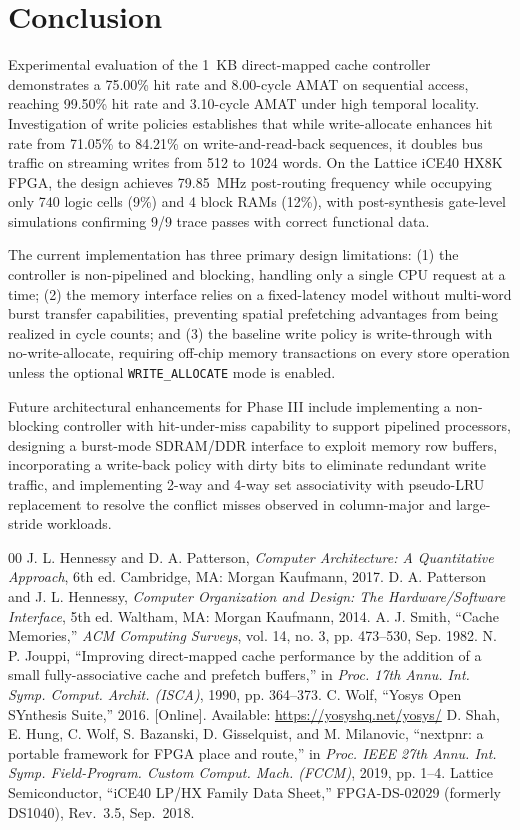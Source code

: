 \documentclass[conference]{IEEEtran}
\begin{document}
\section{Conclusion}
Experimental evaluation of the 1~KB direct-mapped cache controller demonstrates a 75.00\% hit rate and 8.00-cycle AMAT on sequential access, reaching 99.50\% hit rate and 3.10-cycle AMAT under high temporal locality. Investigation of write policies establishes that while write-allocate enhances hit rate from 71.05\% to 84.21\% on write-and-read-back sequences, it doubles bus traffic on streaming writes from 512 to 1024 words. On the Lattice iCE40 HX8K FPGA, the design achieves 79.85~MHz post-routing frequency while occupying only 740 logic cells (9\%) and 4 block RAMs (12\%), with post-synthesis gate-level simulations confirming 9/9 trace passes with correct functional data.

The current implementation has three primary design limitations: (1) the controller is non-pipelined and blocking, handling only a single CPU request at a time; (2) the memory interface relies on a fixed-latency model without multi-word burst transfer capabilities, preventing spatial prefetching advantages from being realized in cycle counts; and (3) the baseline write policy is write-through with no-write-allocate, requiring off-chip memory transactions on every store operation unless the optional \texttt{WRITE\_ALLOCATE} mode is enabled.

Future architectural enhancements for Phase III include implementing a non-blocking controller with hit-under-miss capability to support pipelined processors, designing a burst-mode SDRAM/DDR interface to exploit memory row buffers, incorporating a write-back policy with dirty bits to eliminate redundant write traffic, and implementing 2-way and 4-way set associativity with pseudo-LRU replacement to resolve the conflict misses observed in column-major and large-stride workloads.

\begin{thebibliography}{00}
 J. L. Hennessy and D. A. Patterson, \textit{Computer Architecture: A Quantitative Approach}, 6th ed. Cambridge, MA: Morgan Kaufmann, 2017.
 D. A. Patterson and J. L. Hennessy, \textit{Computer Organization and Design: The Hardware/Software Interface}, 5th ed. Waltham, MA: Morgan Kaufmann, 2014.
 A. J. Smith, ``Cache Memories,'' \textit{ACM Computing Surveys}, vol. 14, no. 3, pp. 473--530, Sep. 1982.
 N. P. Jouppi, ``Improving direct-mapped cache performance by the addition of a small fully-associative cache and prefetch buffers,'' in \textit{Proc. 17th Annu. Int. Symp. Comput. Archit. (ISCA)}, 1990, pp. 364--373.
 C. Wolf, ``Yosys Open SYnthesis Suite,'' 2016. [Online]. Available: \url{https://yosyshq.net/yosys/}
 D. Shah, E. Hung, C. Wolf, S. Bazanski, D. Gisselquist, and M. Milanovic, ``nextpnr: a portable framework for FPGA place and route,'' in \textit{Proc. IEEE 27th Annu. Int. Symp. Field-Program. Custom Comput. Mach. (FCCM)}, 2019, pp. 1--4.
 Lattice Semiconductor, ``iCE40 LP/HX Family Data Sheet,'' FPGA-DS-02029 (formerly DS1040), Rev.~3.5, Sep.~2018.
\end{thebibliography}
\end{document}
